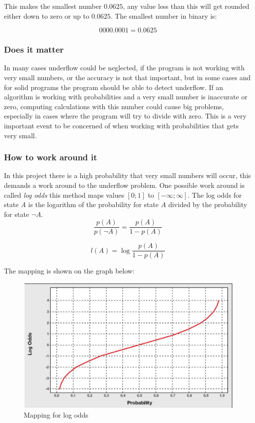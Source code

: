     This makes the smallest number $0.0625$, any value less than this will get rounded either down to zero or up to $0.0625$. The smallest number in binary is:

    $$0000.0001 = 0.0625$$

\subsubsection{Does it matter}
In many cases underflow could be neglected, if the program is not working with very small numbers, or the accuracy is not that important, but in some cases and for solid programs the program should be able to detect underflow. If an algorithm is working with probabilities and a very small number is inaccurate or zero, computing calculations with this number could cause big problems, especially in cases where the program will try to divide with zero. This is a very important event to be concerned of when working with probabilities that gets very small.  

\subsubsection{How to work around it}
In this project there is a high probability that very small numbers will occur, this demands a work around to the underflow problem. One possible work around is called \textit{log odds} this method maps values $[0;1]$ to $[-\infty; \infty]$. The log odds for state \textit{A} is the logarithm of the probability for state $A$ divided by the probability for state $\neg A$.\\

    $$\frac{p(A)}{p(\neg A)} = \frac{p(A)}{1-p(A)}$$

    $$l(A) = \log \frac{p(A)}{1-p(A)}$$

    The mapping is shown on the graph below:\\
	\begin{figure}
		\centering
		\includegraphics[width=1\linewidth]{pictures/logodds_mapping.png}
		\caption{Mapping for log odds}
		\label{fig:log_odds}
	\end{figure}

